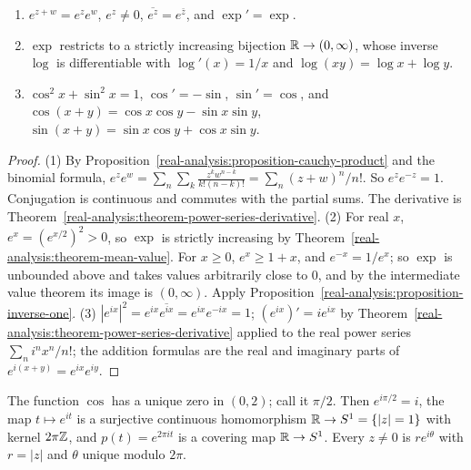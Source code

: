 \begin{proposition}\label{real-analysis:proposition-exponential}
\begin{enumerate}
\item $e^{z+w} = e^ze^w$, $e^z \neq 0$, $\overline{e^z} = e^{\bar z}$, and $\exp' = \exp$.
\item $\exp$ restricts to a strictly increasing bijection $\mathbb{R} \to (0, \infty)$, whose inverse $\log$ is differentiable with $\log'(x) = 1/x$ and $\log(xy) = \log x + \log y$.
\item $\cos^2 x + \sin^2 x = 1$, $\cos' = -\sin$, $\sin' = \cos$, and $\cos(x + y) = \cos x\cos y - \sin x\sin y$, $\sin(x + y) = \sin x\cos y + \cos x\sin y$.
\end{enumerate}
\end{proposition}

\begin{proof}
(1) By Proposition~\ref{real-analysis:proposition-cauchy-product} and the binomial formula, $e^ze^w = \sum_n\sum_k\frac{z^kw^{n-k}}{k!(n-k)!} = \sum_n(z + w)^n/n!$. So $e^ze^{-z} = 1$. Conjugation is
continuous and commutes with the partial sums. The derivative is Theorem~\ref{real-analysis:theorem-power-series-derivative}. (2) For real $x$, $e^x = (e^{x/2})^2 > 0$, so $\exp$ is strictly
increasing by Theorem~\ref{real-analysis:theorem-mean-value}. For $x \geq 0$, $e^x \geq 1 + x$, and $e^{-x} = 1/e^x$; so $\exp$ is unbounded above and takes values arbitrarily close to $0$, and
by the intermediate value theorem its image is $(0, \infty)$. Apply Proposition~\ref{real-analysis:proposition-inverse-one}. (3) $|e^{ix}|^2 = e^{ix}\overline{e^{ix}} = e^{ix}e^{-ix} = 1$;
$(e^{ix})' = ie^{ix}$ by Theorem~\ref{real-analysis:theorem-power-series-derivative} applied to the real power series $\sum_n i^nx^n/n!$; the addition formulas are the real and imaginary parts of $e^{i(x+y)} = e^{ix}e^{iy}$.
\end{proof}

\begin{theorem}\label{real-analysis:theorem-pi}
The function $\cos$ has a unique zero in $(0, 2)$; call it $\pi/2$. Then $e^{i\pi/2} = i$, the map $t \mapsto e^{it}$ is a surjective continuous homomorphism $\mathbb{R} \to S^1 = \{|z| = 1\}$ with kernel
$2\pi\mathbb{Z}$, and $p(t) = e^{2\pi it}$ is a covering map $\mathbb{R} \to S^1$. Every $z \neq 0$ is $re^{i\theta}$ with $r = |z|$ and $\theta$ unique modulo $2\pi$.
\end{theorem}

